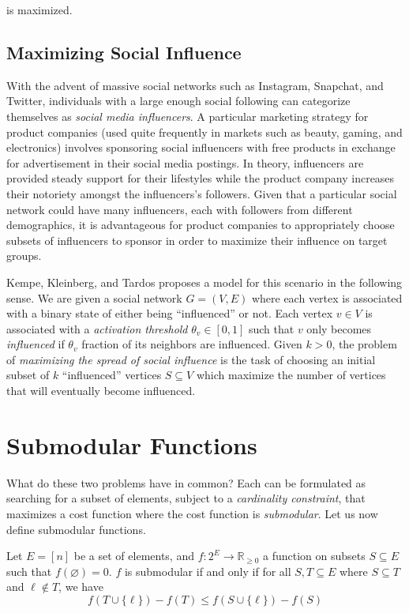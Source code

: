\documentclass{article}
\begin{document}
is maximized.

\subsection{Maximizing Social Influence}

With the advent of massive social networks such as Instagram, Snapchat, and Twitter, individuals with a large enough social following can categorize themselves as \emph{social media influencers}. A particular marketing strategy for product companies (used quite frequently in markets such as beauty, gaming, and electronics) involves sponsoring social influencers with free products in exchange for advertisement in their social media postings. In theory, influencers are provided steady support for their lifestyles while the product company increases their notoriety amongst the influencers's followers. Given that a particular social network could have many influencers, each with followers from different demographics, it is advantageous for product companies to appropriately choose subsets of influencers to sponsor in order to maximize their influence on target groups.

Kempe, Kleinberg, and Tardos proposes a model for this scenario in the following sense. We are given a social network $G = (V, E)$ where each vertex is associated with a binary state of either being ``influenced'' or not. Each vertex $v \in V$ is associated with a \emph{activation threshold} $\theta_v \in [0, 1]$ such that $v$ only becomes \emph{influenced} if $\theta_v$ fraction of its neighbors are influenced. Given $k > 0$, the problem of \emph{maximizing the spread of social influence} is the task of choosing an initial subset of $k$ ``influenced'' vertices $S \subseteq V$ which maximize the number of vertices that will eventually become influenced.

\section{Submodular Functions}

What do these two problems have in common? Each can be formulated as searching for a subset of elements, subject to a \emph{cardinality constraint}, that maximizes a cost function where the cost function is \emph{submodular}. Let us now define submodular functions.

\begin{definition}
Let $E = [n]$ be a set of elements, and $f: 2^E \rightarrow \mathbb{R}_{\geq 0}$ a function on subsets $S \subseteq E$ such that $f(\varnothing) = 0$. $f$ is submodular if and only if for all $S, T \subseteq E$ where $S \subseteq T$ and $\ell \notin T$, we have
\begin{equation}\label{eqn:submodular-def-1}
f(T \cup \{ \ell \}) - f(T) \leq f(S \cup \{ \ell \}) - f(S)
\end{equation}
\end{definition}
\end{document}

